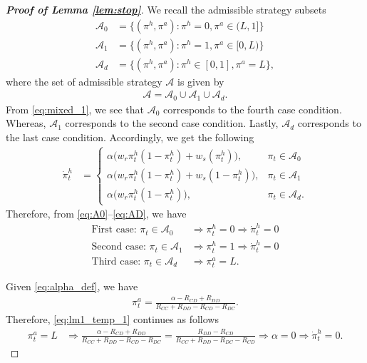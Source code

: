 \documentclass[letterpaper]{article} %
\begin{document}
\begin{proof}[\textbf{Proof of Lemma \ref{lem:stop}}]
We recall the admissible strategy subsets
\begin{align}
    \mathcal{A}_0&=\{(\pi^h,\pi^a):\pi^h=0,\pi^a\in(L,1]\}\label{eq:A0}\\
    \mathcal{A}_1&=\{(\pi^h,\pi^a):\pi^h=1,\pi^a\in[0,L)\} \label{eq:A1}\\
    \mathcal{A}_d&=\{(\pi^h,\pi^a):\pi^h\in[0,1],\pi^a=L\} \label{eq:AD},
\end{align}
where the set of admissible strategy $\mathcal{A}$ is given by
\begin{align}
\label{eq:end_admissible_appendix}
    \mathcal{A}=\mathcal{A}_0\cup\mathcal{A}_1\cup\mathcal{A}_d.
\end{align}
From \eqref{eq:mixed_1}, we see that $\mathcal{A}_0$ corresponds to the fourth case condition. Whereas, $\mathcal{A}_1$ corresponds to the second case condition. Lastly, $\mathcal{A}_d$ corresponds to the last case condition. Accordingly, we get the following
\begin{align}
     \dot{\pi}^h_t &=
	\begin{cases}
	       \alpha \bigg(w_r \pi^h_t(1-\pi^h_t) + w_s (\pi^h_t) \bigg) ,& \pi_t \in \mathcal{A}_0 \\
		   \alpha \bigg(w_r \pi^h_t(1-\pi^h_t) + w_s (1-\pi^h_t) \bigg) ,& \pi_t \in \mathcal{A}_1  \\
	       \alpha \bigg(w_r \pi^h_t(1-\pi^h_t) \bigg) ,& \pi_t \in \mathcal{A}_d.
	\end{cases} \label{eq:l1_1}
\end{align}
Therefore, from \eqref{eq:A0}--\eqref{eq:AD}, we have
\begin{align}
    \textrm{First case: } \pi_t \in \mathcal{A}_0 &\Rightarrow \pi^h_t=0 \Rightarrow \dot{\pi}^h_t = 0 \label{eq:l3_step_1_1}\\
    \textrm{Second case: } \pi_t \in \mathcal{A}_1  &\Rightarrow \pi^h_t=1 \Rightarrow \dot{\pi}^h_t = 0 \label{eq:l3_step_1_2}\\
    \textrm{Third case: } \pi_t \in \mathcal{A}_d &\Rightarrow \pi^a_t=L.
    \label{eq:lm1_temp_1}
\end{align}

Given \eqref{eq:alpha_def}, we have
\begin{align}
    \pi^a_t=\frac{\alpha-R_{CD}+R_{DD}}{R_{CC}+R_{DD}-R_{CD}-R_{DC}}.
\end{align}
Therefore, \eqref{eq:lm1_temp_1} continues as follows
\begin{align}
    \pi^a_t=L&\Rightarrow\frac{\alpha-R_{CD}+R_{DD}}{R_{CC}+R_{DD}-R_{CD}-R_{DC}}=\frac{R_{DD}-R_{CD}}{R_{CC}+R_{DD}-R_{DC}-R_{CD}} \Rightarrow \alpha=0 \Rightarrow \dot{\pi}^h_t = 0.
    \label{eq:lm1_temp_1_end}
\end{align}
    

\end{proof}
\end{document}
